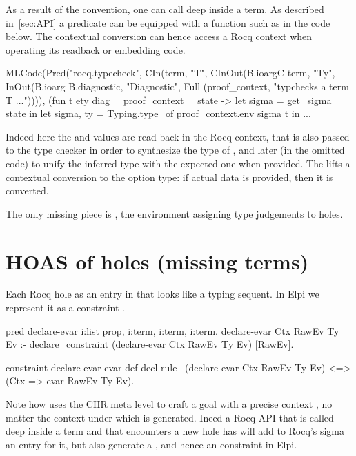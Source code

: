 \documentclass[a4paper, 11pt]{book}
\begin{document}
As a result of the convention, one can call 
deep inside a term. As described in~\ref{sec:API} a predicate can
be equipped with a  function such
as  in the code below. The 
contextual conversion can hence access a Rocq context when operating its
readback or embedding code.

\begin{ocamlcode}
MLCode(Pred("rocq.typecheck",
  CIn(term, "T",
  CInOut(B.ioargC term, "Ty",
  InOut(B.ioarg B.diagnostic, "Diagnostic",
  Full (proof_context, "typchecks a term T ...")))),
    (fun t ety diag _ proof_context _ state ->
      let sigma = get_sigma state in
      let sigma, ty = Typing.type_of proof_context.env sigma t in
      ...
\end{ocamlcode}

Indeed here the  and  values
are read back in the  Rocq context,
that is also passed to the type checker in order to synthesize the
type of , and later (in the omitted code) to unify
the inferred type with the expected one  when provided.
The  lifts a contextual conversion to the option
type: if actual data is provided, then it is converted.

The only missing piece is , the environment assigning
type judgements to holes.

\section{HOAS of holes (missing terms)}

Each Rocq hole as an entry in  that looks like a
typing sequent. In Elpi we represent it as a constraint .

\begin{elpicode}
pred declare-evar i:list prop, i:term, i:term, i:term. %
declare-evar Ctx RawEv Ty Ev :-
  declare_constraint (declare-evar Ctx RawEv Ty Ev) [RawEv].

constraint declare-evar evar def decl {
  rule \ (declare-evar Ctx RawEv Ty Ev) <=> (Ctx => evar RawEv Ty Ev).
}
\end{elpicode}

Note how  uses the CHR meta level to craft
a goal with a precise context , no matter the context
under which  is generated. Ineed a Rocq API
that is called deep inside a term and that encounters a new hole has
will add to Rocq's sigma an entry for it, but also generate a
, and hence an  constraint
in Elpi.
\end{document}

